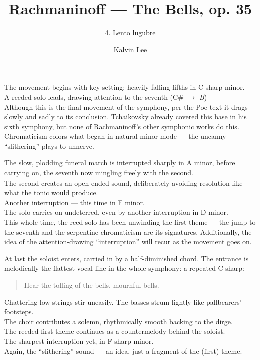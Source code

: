 \documentclass{beamer}
\title{Rachmaninoff --- The Bells, op. 35}
\subtitle{4. Lento lugubre}
\author{Kalvin Lee}
\date{}
\begin{document}
 

\begin{frame} 
  \titlepage
\end{frame} 

\begin{frame}
  The movement begins with key-setting: heavily falling fifths in C sharp minor. 
  \pause \\ 
  A reeded solo leads, drawing attention to the seventh (C\# \(\to\) \emph{B}) 
  \pause \\ 
  Although this is the final movement of the symphony, per the Poe text it drags slowly and sadly to its conclusion. Tchaikovsky already covered this base in his sixth symphony, but none of Rachmaninoff's other symphonic works do this. 
  \pause \\
  Chromaticism colors what began in natural minor mode --- the uncanny ``slithering'' plays to unnerve. 
\end{frame} 

\begin{frame} 
  The slow, plodding funeral march is interrupted sharply in A minor, \pause before carrying on, the seventh now mingling freely with the second. 
  \pause \\
  The second creates an open-ended sound, deliberately avoiding resolution like what the tonic would produce. 
  \pause \\ 
  Another interruption --- this time in F minor. 
  \pause \\ 
  The solo carries on undeterred, \pause even by another interruption in D minor. 
  \pause \\ 
  This whole time, the reed solo has been unwinding the first theme --- the jump to the seventh and the serpentine chromaticism are its signatures. Additionally, the idea of the attention-drawing ``interruption'' will recur as the movement goes on. 
\end{frame} 

\begin{frame}
  At last the soloist enters, carried in by a half-diminished chord. The entrance is melodically the flattest vocal line in the whole symphony: a repeated C sharp: 
  \pause \\ 
  \begin{quote} 
    Hear{\pause} the{\pause} toll{\pause}ing{\pause} of{\pause} the{\pause} bells,{\pause} mourn{\pause}ful{\pause} bells.{\pause} 
  \end{quote} 
  Chattering low strings stir uneasily. The basses strum lightly like pallbearers' footsteps. 
  \pause \\ 
  The choir contributes a solemn, rhythmically smooth backing to the dirge. 
  \pause \\ 
  The reeded first theme continues as a countermelody behind the soloist. 
  \pause \\ 
  The sharpest interruption yet, in F sharp minor. 
  \pause \\ 
  Again, the ``slithering'' sound --- an idea, just a fragment of the (first) theme. 
\end{frame} 
\end{document}
